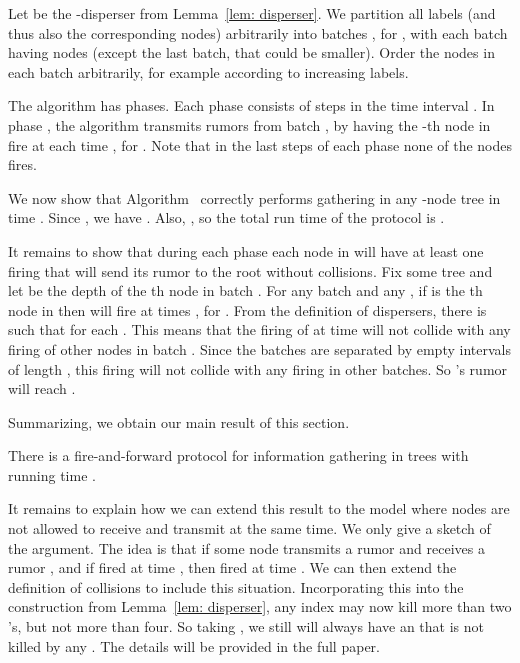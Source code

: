 \begin{myalgorithm}{}
Let  be the -disperser from Lemma~\ref{lem: disperser}. 
We partition all labels (and thus also the corresponding nodes) arbitrarily
into batches , for , with each batch  having 
nodes (except the last batch, that could be smaller).
Order the nodes in each batch arbitrarily, for example according to increasing labels.

The algorithm has  phases. Each phase  consists of  steps in the time interval
. In phase , the algorithm transmits rumors from batch ,
by having the -th node in  fire at each time , for .
Note that in the last  steps of each phase none of the nodes fires.
\end{myalgorithm}



We now show that Algorithm~ correctly performs gathering in any -node
tree in time .  Since , we have
. Also, , so the total run time of the protocol is .

It remains to show that during each phase  each
node in  will have at least one firing that will send its rumor to the root  without collisions.
Fix some tree  and let  be the depth of the
th node in batch .
For any batch  and any , if  is the
th node in  then  will fire at times , for .
From the definition of dispersers, there is
 such that  for each .
This means that the firing of  at time  will not collide with any
firing of other nodes in batch . Since the batches are separated by empty intervals
of length , this firing will not collide with any firing in other batches.
So 's rumor will reach . 

Summarizing, we obtain our main result of this section.



\begin{theorem}\label{thm: n^1.5 fire-and-forward upper bound}
There is a fire-and-forward protocol for information gathering in trees
with running time .
\end{theorem}

It remains to explain how we can extend this result to the model where
nodes are not allowed to receive and transmit at the same time. We only
give a sketch of the argument. The idea is that if some node  transmits a rumor
 and receives a rumor , and if  fired at time , then 
 fired at time . We can then extend the
definition of collisions to include this situation. Incorporating this into
the construction from Lemma~\ref{lem: disperser}, any index  may now
kill more than two 's, but not more than four. So taking ,
we still will always have an  that is not killed by any .
The details will be provided in the full paper.



